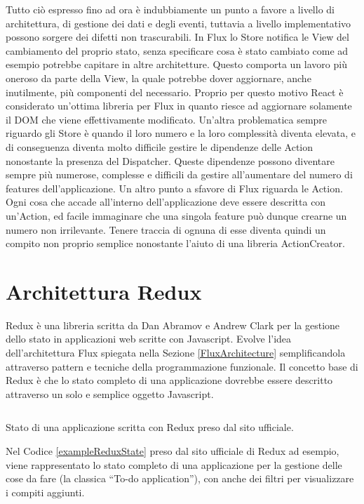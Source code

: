 Tutto ciò espresso fino ad ora è indubbiamente un punto a favore a livello di architettura, di gestione dei dati e degli eventi, tuttavia a livello implementativo possono sorgere dei difetti non trascurabili.
In Flux lo Store notifica le View del cambiamento del proprio stato, senza specificare cosa è stato cambiato come ad esempio potrebbe capitare in altre architetture. Questo comporta un lavoro più oneroso da parte della View, la quale potrebbe dover aggiornare, anche inutilmente, più componenti del necessario. Proprio per questo motivo React è considerato un'ottima libreria per Flux in quanto riesce ad aggiornare solamente il DOM che viene effettivamente modificato.
Un'altra problematica sempre riguardo gli Store è quando il loro numero e la loro complessità diventa elevata, e di conseguenza diventa molto difficile gestire le dipendenze delle Action nonostante la presenza del Dispatcher. Queste dipendenze possono diventare sempre più numerose, complesse e difficili da gestire all'aumentare del numero di features dell'applicazione.
Un altro punto a sfavore di Flux riguarda le Action. Ogni cosa che accade all'interno dell'applicazione deve essere descritta con un'Action, ed facile immaginare che una singola feature può dunque crearne un numero non irrilevante. Tenere traccia di ognuna di esse diventa quindi un compito non proprio semplice nonostante l'aiuto di una libreria ActionCreator.

\section{Architettura Redux}
\label{ReduxArchitecture}

Redux è una libreria scritta da Dan Abramov e Andrew Clark per la gestione dello stato in applicazioni web scritte con Javascript. Evolve l'idea dell'architettura Flux spiegata nella Sezione \ref{FluxArchitecture} semplificandola attraverso pattern e tecniche della programmazione funzionale. Il concetto base di Redux è che lo stato completo di una applicazione dovrebbe essere descritto attraverso un solo e semplice oggetto Javascript.

\begin{listing}[ht]
\inputminted{javascript}{sources/exampleReduxState.js}
\caption{Stato di una applicazione scritta con Redux preso dal sito ufficiale.} 
\label{exampleReduxState} 
\end{listing}

Nel Codice \ref{exampleReduxState} preso dal sito ufficiale di Redux ad esempio, viene rappresentato lo stato completo di una applicazione per la gestione delle cose da fare (la classica “To-do application”), con anche dei filtri per visualizzare i compiti aggiunti.

